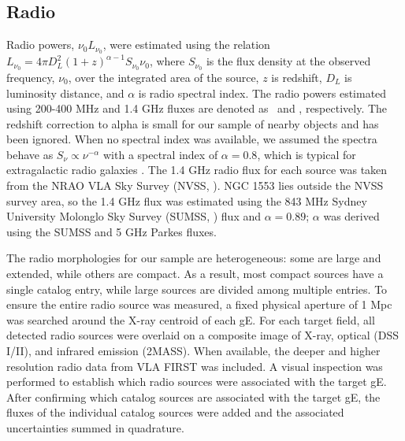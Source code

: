 \documentclass[12pt, preprint]{aastex}
\begin{document}
\subsection{Radio}
\label{sec:radio}

Radio powers, $\nu_0 L_{\nu_0}$, were estimated using the relation
$L_{\nu_0} = 4 \pi D_L^2 (1+z)^{\alpha-1} S_{\nu_0} \nu_0$, where
$S_{\nu_0}$ is the flux density at the observed frequency, $\nu_0$,
over the integrated area of the source, $z$ is redshift, $D_L$ is
luminosity distance, and $\alpha$ is radio spectral index. The radio
powers estimated using 200-400 MHz and 1.4 GHz fluxes are denoted as
\plow\ and \phigh, respectively. The redshift correction to alpha is
small for our sample of nearby objects and has been ignored. When no
spectral index was available, we assumed the spectra behave as
$S_{\nu} \propto \nu^{-\alpha}$ with a spectral index of $\alpha =
0.8$, which is typical for extragalactic radio galaxies
\citep{1992ARA&A..30..575C}. The 1.4 GHz radio flux for each source
was taken from the NRAO VLA Sky Survey (NVSS, \citealt{nvss}). NGC
1553 lies outside the NVSS survey area, so the 1.4 GHz flux was
estimated using the 843 MHz Sydney University Molonglo Sky Survey
(SUMSS, \citealt{sumss1}) flux and $\alpha = 0.89$; $\alpha$ was
derived using the SUMSS and 5 GHz Parkes \citep{1970ApL.....5...29W}
fluxes.

The radio morphologies for our sample are heterogeneous: some are
large and extended, while others are compact. As a result, most
compact sources have a single catalog entry, while large sources are
divided among multiple entries. To ensure the entire radio source was
measured, a fixed physical aperture of 1 Mpc was searched around the
X-ray centroid of each gE. For each target field, all detected radio
sources were overlaid on a composite image of X-ray, optical (DSS
I/II), and infrared emission (2MASS). When available, the deeper and
higher resolution radio data from VLA FIRST was included. A visual
inspection was performed to establish which radio sources were
associated with the target gE. After confirming which catalog sources
are associated with the target gE, the fluxes of the individual
catalog sources were added and the associated uncertainties summed in
quadrature.
\end{document}

